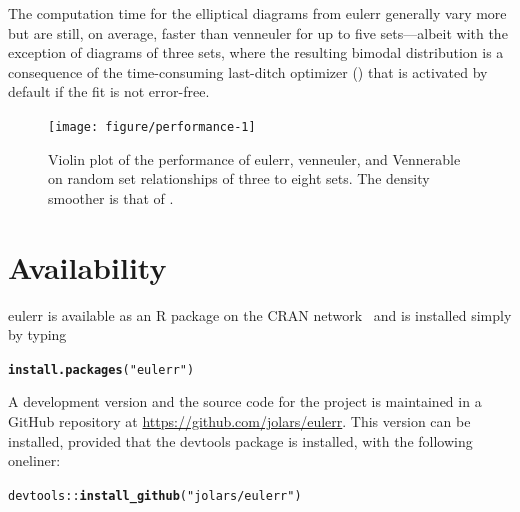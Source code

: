 \documentclass[
  oneside,
  openany,
  numbers=noendperiod,
  parskip=half,
  bibliography=totoc
]{scrbook}\usepackage[]{graphicx}\usepackage{xcolor}
\makeatletter
\newcommand{\hlstr}[1]{\textcolor[rgb]{0.192,0.494,0.8}{#1}}%
\newcommand{\hlopt}[1]{\textcolor[rgb]{0,0,0}{#1}}%
\newcommand{\hlstd}[1]{\textcolor[rgb]{0.345,0.345,0.345}{#1}}%
\newcommand{\hlkwd}[1]{\textcolor[rgb]{0.737,0.353,0.396}{\textbf{#1}}}%
\newenvironment{kframe}{%
 \def\at@end@of@kframe{}%
 \ifinner\ifhmode%
  \def\at@end@of@kframe{\end{minipage}}%
  \begin{minipage}{\columnwidth}%
 \fi\fi%
 \def\FrameCommand##1{\hskip\@totalleftmargin \hskip-\fboxsep
 \colorbox{shadecolor}{##1}\hskip-\fboxsep
     \hskip-\linewidth \hskip-\@totalleftmargin \hskip\columnwidth}%
 \MakeFramed {\advance\hsize-\width
   \@totalleftmargin\z@ \linewidth\hsize
   \@setminipage}}%
 {\par\unskip\endMakeFramed%
 \at@end@of@kframe}
\newenvironment{knitrout}{}{} %
\newcommand{\pkg}[1]{{\fontseries{b}\selectfont #1}}
\makeatother
\begin{document}
The computation time for the elliptical
diagrams from \pkg{eulerr} generally vary more but are still, on average,
faster than \pkg{venneuler} for up to five sets---albeit with the exception
of diagrams of three sets, where the resulting bimodal distribution is a
consequence of the time-consuming
last-ditch optimizer () that is activated by default
if the fit is not error-free.

\begin{figure}[hbtp]
\begin{knitrout}\small
{}\color{fgcolor}

{\centering \texttt{[image: figure/performance-1]} 

}



\end{knitrout}
\caption{Violin plot of the performance of \pkg{eulerr}, \pkg{venneuler}, and \pkg{Vennerable} on
random set relationships of three to eight sets. The density smoother is that of \citet{Sheather_1991}.}
\label{fig:performance}
\end{figure}

\section{Availability}\label{sec:availability}

\pkg{eulerr} is available as an R package on the CRAN network~\citep{RCT_2017a}
and is installed simply by typing

\begin{knitrout}\small
{}\color{fgcolor}\begin{kframe}
\begin{alltt}
\hlkwd{install.packages}\hlstd{(}\hlstr{"eulerr"}\hlstd{)}
\end{alltt}
\end{kframe}
\end{knitrout}

A development version and the source code for the project is maintained in
a GitHub repository at
\url{https://github.com/jolars/eulerr}. This version
can be installed, provided that the \pkg{devtools} package is installed,
with the following oneliner:

\begin{knitrout}\small
{}\color{fgcolor}\begin{kframe}
\begin{alltt}
\hlstd{devtools}\hlopt{::}\hlkwd{install_github}\hlstd{(}\hlstr{"jolars/eulerr"}\hlstd{)}
\end{alltt}
\end{kframe}
\end{knitrout}
\end{document}
